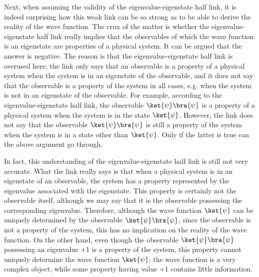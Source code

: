 Next, when assuming the validity of the eigenvalue-eigenstate half link, it is indeed surprising how this weak link can be so strong as to be able to derive the reality of the wave function. 
The crux of the matter is whether  the eigenvalue-eigenstate half link really implies that the observables of which the wave function is an eigenstate are properties of a physical system.
It can be argued that the answer is negative.
The reason is that the eigenvalue-eigenstate half link is overused here; 
the link only says that an observable is a property of a physical system when the system is in an eigenstate of the observable, and it does not say that the observable is a property of the system in all cases, e.g. when the system is not in an eigenstate of the observable. For example, according to the eigenvalue-eigenstate half link, the observable $\ket{\psi}\bra{\psi}$ is a property of a physical system when the system is in the state $\ket{\psi}$. However, the link does not say that the observable $\ket{\psi}\bra{\psi}$ is still a  property of the system when the system is in a state other than $\ket{\psi}$. Only if the latter is true can the above argument go through.

In fact, this understanding of the eigenvalue-eigenstate half link is still not very accurate. 
What the link really says is that when a physical system is in an eigenstate of an observable,  the system has a  property represented by the eigenvalue associated with the eigenstate. 
This property  is certainly not the observable itself, although we may say that it is the observable possessing the corresponding eigenvalue.
Therefore, although  the wave function $\ket{\psi}$ can be uniquely determined by the observable $\ket{\psi}\bra{\psi}$, since the observable is not a  property of the system, this has no implication on the reality of the wave function.
On the other hand, even though the observable $\ket{\psi}\bra{\psi}$ possessing an eigenvalue +1 is a  property of the system, this property cannot uniquely determine  the wave function $\ket{\psi}$; the wave function is a very complex object, while some property having value +1 contains little information.

